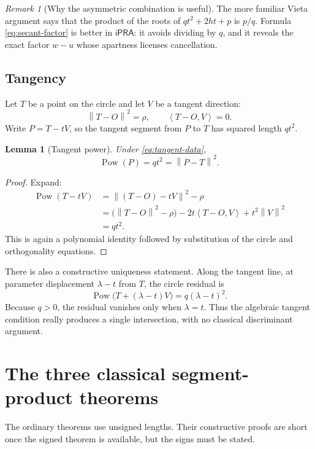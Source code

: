 \documentclass[11pt,letterpaper]{article}
\newtheorem{lemma}[theorem]{Lemma}
\theoremstyle{definition}
\theoremstyle{remark}
\newtheorem{remark}[theorem]{Remark}
\newcommand{\ipra}{\mathsf{iPRA}}
\newcommand{\Pow}{\operatorname{Pow}}
\newcommand{\norm}[1]{\left\lVert #1\right\rVert}
\newcommand{\ip}[2]{\left\langle #1,#2\right\rangle}
\begin{document}
\begin{remark}[Why the asymmetric combination is useful]
The more familiar Vieta argument says that the product of the roots of
\(qt^2+2ht+p\) is \(p/q\).  Formula \eqref{eq:secant-factor} is better in
\(\ipra\): it avoids dividing by \(q\), and it reveals the exact factor
\(w-u\) whose apartness licenses cancellation.
\end{remark}

\subsection{Tangency}

Let \(T\) be a point on the circle and let \(V\) be a tangent direction:
\[
 \norm{T-O}^2=\rho,
 \qquad
 \ip{T-O}{V}=0.
 \tag{7.8}\label{eq:tangent-data}
\]
Write \(P=T-tV\), so the tangent segment from \(P\) to \(T\) has squared
length \(qt^2\).

\begin{lemma}[Tangent power]
\label{lem:tangent-power}
Under \eqref{eq:tangent-data},
\[
 \Pow(P)=qt^2=\norm{P-T}^2.
 \tag{7.9}\label{eq:tangent-power}
\]
\end{lemma}

\begin{proof}
Expand:
\begin{align*}
 \Pow(T-tV)
 &=\norm{(T-O)-tV}^2-\rho\\
 &=\bigl(\norm{T-O}^2-\rho\bigr)
   -2t\ip{T-O}{V}+t^2\norm V^2\\
 &=qt^2.
\end{align*}
This is again a polynomial identity followed by substitution of the circle and
orthogonality equations.
\end{proof}

There is also a constructive uniqueness statement.  Along the tangent line,
at parameter displacement \(\lambda-t\) from \(T\), the circle residual is
\[
 \Pow\bigl(T+(\lambda-t)V\bigr)=q(\lambda-t)^2.
 \tag{7.10}\label{eq:tangent-residual}
\]
Because \(q>0\), the residual vanishes only when \(\lambda=t\).  Thus the
algebraic tangent condition really produces a single intersection, with no
classical discriminant argument.

\section{The three classical segment-product theorems}
\label{sec:specializations}

The ordinary theorems use unsigned lengths.  Their constructive proofs are
short once the signed theorem is available, but the signs must be stated.
\end{document}
